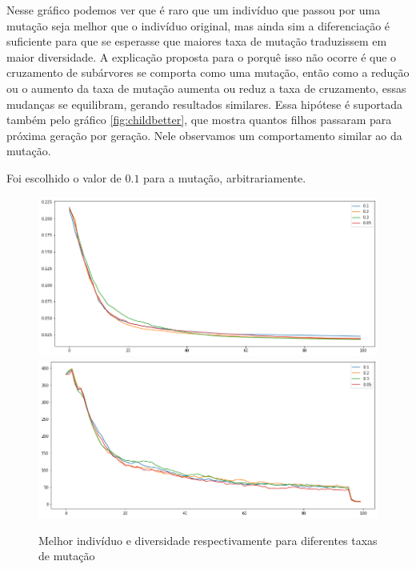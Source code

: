 \documentclass[10pt,twocolumn,letterpaper]{article}
\begin{document}
Nesse gráfico podemos ver que é raro que um indivíduo que passou por uma mutação seja melhor que o indivíduo original, mas ainda sim a diferenciação é suficiente para que se esperasse que maiores taxa de mutação traduzissem em maior diversidade. A explicação proposta para o porquê isso não ocorre é que o cruzamento de subárvores se comporta como uma mutação, então como a redução ou o aumento da taxa de mutação aumenta ou reduz a taxa de cruzamento, essas mudanças se equilibram, gerando resultados similares. Essa hipótese é suportada também pelo gráfico \ref{fig:childbetter}, que mostra quantos filhos passaram para próxima geração por geração. Nele observamos um comportamento similar ao da mutação.

Foi escolhido o valor de $0.1$ para a mutação, arbitrariamente.

\begin{figure}[H]
   \begin{center}
   \includegraphics[width=\linewidth]{mut_best.png}
   \includegraphics[width=\linewidth]{mut_div.png}
   \end{center}
      \caption{Melhor indivíduo e diversidade respectivamente para diferentes taxas de mutação}
      \label{fig:mut}
\end{figure}
\end{document}
